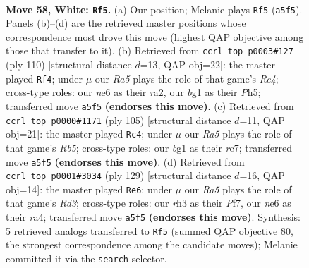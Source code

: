 \documentclass[11pt]{article}
\begin{document}
\clearpage

\begin{figure}[p]\centering
\begin{subfigure}{0.46\textwidth}\centering
\resizebox{\linewidth}{!}{%
\newchessgame
\chessboard[
  setfen={6k1/8/3Nn3/R5P1/P7/7r/8/4K1b1 w - - 6 58},
  showmover=false,
  pgfstyle=straightmove, color=movearrow, markmove={a5-f5}
]}
\caption{}
\end{subfigure}\hfill
\begin{subfigure}{0.46\textwidth}\centering
\resizebox{\linewidth}{!}{%
\newchessgame
\chessboard[
  setfen={8/7p/1p1k4/7P/P3R3/4P3/r7/4K3 w - - 5 56},
  showmover=false,
  pgfstyle=straightmove, color=movearrow, markmove={e4-f4}
]}
\caption{}
\end{subfigure}
\\[4pt]
\begin{subfigure}{0.46\textwidth}\centering
\resizebox{\linewidth}{!}{%
\newchessgame
\chessboard[
  setfen={6k1/2R5/8/1p5p/1r6/4K1N1/8/8 b - - 2 53},
  showmover=false,
  pgfstyle=straightmove, color=movearrow, markmove={b4-c4}
]}
\caption{}
\end{subfigure}\hfill
\begin{subfigure}{0.46\textwidth}\centering
\resizebox{\linewidth}{!}{%
\newchessgame
\chessboard[
  setfen={8/5pk1/3r4/8/R2p4/3B1K2/8/8 b - - 4 65},
  showmover=false,
  pgfstyle=straightmove, color=movearrow, markmove={d6-e6}
]}
\caption{}
\end{subfigure}
\caption{\textbf{Move 58, White: \texttt{Rf5}.} (a) Our position; Melanie plays \texttt{Rf5} (\texttt{a5f5}). Panels (b)--(d) are the retrieved master positions whose correspondence most drove this move (highest QAP objective among those that transfer to it). (b) Retrieved from \texttt{ccrl\_top\_p0003\#127} (ply 110) [structural distance $d$=13, QAP obj=22]: the master played \texttt{Rf4}; under $\mu$ our \emph{Ra5} plays the role of that game's \emph{Re4}; cross-type roles: our \emph{n}e6 as their \emph{r}a2, our \emph{b}g1 as their \emph{P}h5; transferred move \texttt{a5f5} \textbf{(endorses this move)}. (c) Retrieved from \texttt{ccrl\_top\_p0000\#1171} (ply 105) [structural distance $d$=11, QAP obj=21]: the master played \texttt{Rc4}; under $\mu$ our \emph{Ra5} plays the role of that game's \emph{Rb5}; cross-type roles: our \emph{b}g1 as their \emph{r}c7; transferred move \texttt{a5f5} \textbf{(endorses this move)}. (d) Retrieved from \texttt{ccrl\_top\_p0001\#3034} (ply 129) [structural distance $d$=16, QAP obj=14]: the master played \texttt{Re6}; under $\mu$ our \emph{Ra5} plays the role of that game's \emph{Rd3}; cross-type roles: our \emph{r}h3 as their \emph{P}f7, our \emph{n}e6 as their \emph{r}a4; transferred move \texttt{a5f5} \textbf{(endorses this move)}. Synthesis: 5 retrieved analogs transferred to \texttt{Rf5} (summed QAP objective 80, the strongest correspondence among the candidate moves); Melanie committed it via the \texttt{search} selector.}
\label{fig:thought-m114}
\end{figure}
\end{document}
